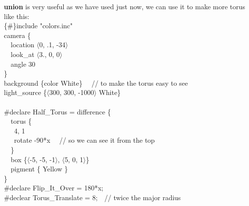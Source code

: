 \documentclass[fleqn,10pt]{wlscirep}
\begin{document}
\newline
\textbf{union} is very useful as we have used just now, we can use it to make more torus like this:\\
{\color{blue}
\{\#\}include "colors.inc"   \\
camera \{   \\
\ \ location $\langle$0, .1, -34$\rangle$   \\
\ \ look\_at $\langle$3., 0, 0$\rangle$   \\
\ \ angle 30    \\
\}   \\
background \{color White\} \ \ // to make the torus easy to see   \\
light\_source \{$\langle$300, 300, -1000$\rangle$ White\}   \\
}\\
{\color{blue}
\#declare Half\_Torus = difference \{  \\
\ \ torus \{ \\
\ \ \ 4, 1  \\
\ \ \ rotate -90*x \ \ // so we can see it from the top  \\
\ \ \}  \\
\ \ box \{$\langle$-5, -5, -1$\rangle$, $\langle$5, 0, 1$\rangle$\}  \\
\ \ pigment \{ Yellow \}  \\
\}  \\
\#declare Flip\_It\_Over = 180*x;  \\
\#declear Torus\_Translate = 8;\ \ // twice the major radius
}\\
\end{document}
